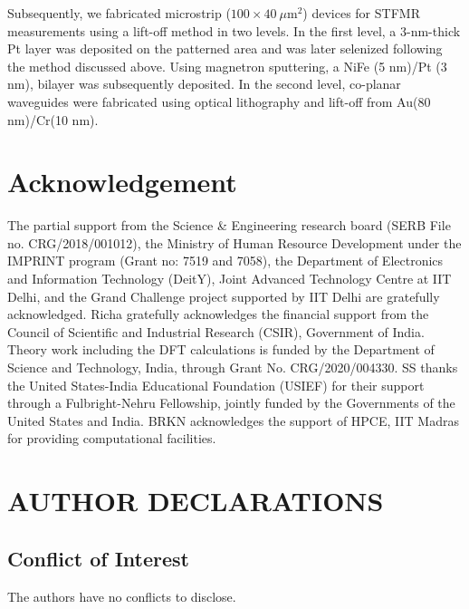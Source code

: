 \documentclass[journal=jacsat,manuscript=article]{achemso}
\begin{document}
Subsequently, we fabricated microstrip ($100\times 40~\mu$m$^2$) devices for STFMR measurements using a lift-off method in two levels. In the first level, a 3-nm-thick Pt layer was deposited on the patterned area and was later selenized following the method discussed above. Using magnetron sputtering, a NiFe (5 nm)/Pt (3 nm), bilayer was subsequently deposited. In the second level, co-planar waveguides were fabricated using optical lithography and lift-off from Au(80 nm)/Cr(10 nm). 
\section*{Acknowledgement}
The partial support from the Science \& Engineering research board (SERB File no. CRG/2018/001012), the Ministry of Human Resource Development under the IMPRINT program (Grant no: 7519 and 7058), the Department of Electronics and Information Technology (DeitY), Joint Advanced Technology Centre at IIT Delhi, and the Grand Challenge project supported by IIT Delhi are gratefully acknowledged. Richa gratefully acknowledges the financial support from the Council of Scientific and Industrial Research (CSIR), Government of India. Theory work including the DFT calculations is funded by the Department of Science and Technology, India, through Grant No. CRG/2020/004330. SS thanks the United States-India Educational Foundation (USIEF) for their support through a Fulbright-Nehru Fellowship, jointly funded by the Governments of the United States and India. BRKN acknowledges the support of HPCE, IIT Madras for providing computational facilities.
\section*{AUTHOR DECLARATIONS}
\subsection*{Conflict of Interest}
The authors have no conflicts to disclose.
\end{document}

